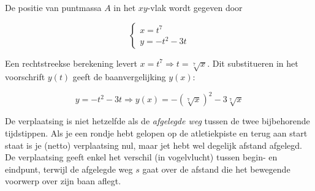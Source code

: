 \documentclass{ximera}
\begin{document}
\begin{example}
De positie van puntmassa \(A\) in het \(xy\)-vlak wordt gegeven door 

\[
\left\{
\begin{array}{l}
	x = t^7 \\ 
	y = -t^2 - 3t
\end{array}
\right.
\]


Een rechtstreekse berekening levert \( x = t^7 \Rightarrow t = \sqrt[7]{x} \). 
Dit substitueren in het voorschrift \(y(t)\) geeft de baanvergelijking \(y(x)\): 

\[
y = -t^2 - 3t \Rightarrow y(x) = -(\sqrt[7]{x})^2 - 3\sqrt[7]{x}
\]


\end{example}


De verplaatsing is niet hetzelfde als de \emph{afgelegde weg} tussen de twee bijbehorende tijdstippen. 
Als je een rondje hebt gelopen op de atletiekpiste en terug aan start staat is je (netto) verplaatsing nul, maar jet hebt wel degelijk afstand afgelegd.
De verplaatsing geeft enkel het verschil (in vogelvlucht) tussen begin- en eindpunt, terwijl de afgelegde weg \(s\) gaat over de afstand die het bewegende voorwerp over zijn baan aflegt. 

\begin{image}[0.5\textwidth]

\end{image}


\end{document}
